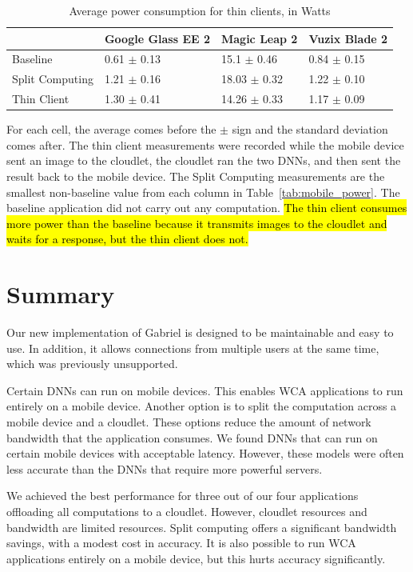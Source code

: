 \begin{table}
\begin{tabular}{|l||l|l|l|}
  \hline
  & Google Glass EE 2 & Magic Leap 2 & Vuzix Blade 2\\
  \hline
  \hline
  Baseline & 0.61 $\pm$ 0.13 & 15.1 $\pm$ 0.46 & 0.84 $\pm$ 0.15\\
  Split Computing & 1.21 $\pm$ 0.16 & 18.03 $\pm$ 0.32 & 1.22 $\pm$ 0.10\\
  Thin Client & 1.30 $\pm$ 0.41 & 14.26 $\pm$ 0.33 & 1.17 $\pm$ 0.09\\
  \hline
\end{tabular}
\begin{captiontext}
    For each cell, the average comes before the $\pm$ sign and the standard
    deviation comes after.
    The thin client measurements were recorded while the mobile device sent an
    image to the cloudlet, the cloudlet ran the two DNNs, and then sent the
    result back to the mobile device.
    The Split Computing measurements are the smallest non-baseline value from
    each column in Table~\ref{tab:mobile_power}.
    The baseline application did not carry out any computation.
    \hl{
      The thin client consumes more power than the baseline because it transmits
      images to the cloudlet and waits for a response, but the thin client does
      not.
    }
\end{captiontext}
  \caption{
    Average power consumption for thin clients, in Watts
  }\label{tab:thin_power}
\end{table}

\section{Summary}

Our new implementation of Gabriel is designed to be maintainable and easy to
use.
In addition, it allows connections from multiple users at the same time, which
was previously unsupported.

Certain DNNs can run on mobile devices.
This enables WCA applications to run entirely on a mobile device.
Another option is to split the computation across a mobile device and a
cloudlet.
These options reduce the amount of network bandwidth that the application
consumes.
We found DNNs that can run on certain mobile devices with acceptable latency.
However, these models were often less accurate than the DNNs that require more
powerful servers.

We achieved the best performance for three out of our four applications
offloading all computations to a cloudlet.
However, cloudlet resources and bandwidth are limited resources.
Split computing offers a significant bandwidth savings, with a modest cost in
accuracy.
It is also possible to run WCA applications entirely on a mobile device, but
this hurts accuracy significantly.
